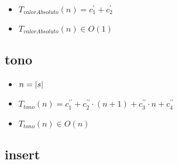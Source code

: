 \documentclass{article}
\begin{document}
    \begin{itemize}
        \item $T_{valorAbsoluto}(n) = c^{\prime}_1 +
                                      c^{\prime}_2$
        \item $T_{valorAbsoluto}(n) \in O(1)$
    \end{itemize}

    \subsection*{tono}

    \begin{minipage}{0.70\textwidth}
        
    \end{minipage}
    \hfill
    \begin{minipage}{0.25\textwidth}
    \end{minipage}

    \begin{itemize}
        \item $n = |s|$
        \item $T_{tono}(n) = c^{\prime\prime}_1 +
                             c^{\prime\prime}_2 \cdot (n + 1) +
                             c^{\prime\prime}_3 \cdot n +
                             c^{\prime\prime}_4 $
        \item $T_{tono}(n) \in O(n)$
    \end{itemize}

    \subsection*{insert}
\end{document}
